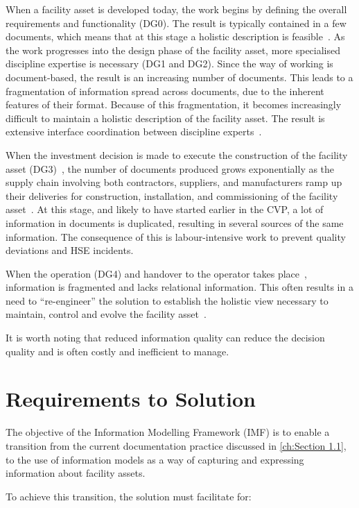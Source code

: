 \documentclass[../main.tex]{subfiles}
\begin{document}
When a facility asset is developed today, the work begins by defining the overall requirements and functionality
(DG0). The result is typically contained in a few documents, which means that at this stage a holistic description is
feasible~. As the work progresses into the design phase of the facility asset, more specialised discipline
expertise is necessary (DG1 and DG2). Since the way of working is document-based, the result is an increasing number
of documents. This leads to a fragmentation of information spread across documents, due to the inherent features of
their format. Because of this fragmentation, it becomes increasingly difficult to maintain a holistic description of the
facility asset. The result is extensive interface coordination between discipline experts~.

When the investment decision is made to execute the construction of the facility asset (DG3)~, the number of
documents produced grows exponentially as the supply chain involving both contractors, suppliers, and manufacturers
ramp up their deliveries for construction, installation, and commissioning of the facility asset~. At this
stage, and likely to have started earlier in the CVP, a lot of information in documents is duplicated, resulting in
several sources of the same information. The consequence of this is labour-intensive work to
    prevent quality deviations and HSE incidents.

When the operation (DG4) and handover to the operator takes place~, information is fragmented and lacks
relational information. This often results in a need to ``re-engineer'' the solution to establish the holistic view
necessary to maintain, control and evolve the facility asset~.

It is worth noting that reduced information quality can reduce the decision quality and is often costly and
inefficient to manage.

\section{Requirements to  Solution}
\label{ch:Section 1.2}
The objective of the Information Modelling Framework (IMF) is to enable
a transition from the current documentation practice discussed in \autoref{ch:Section 1.1}, to the use of information
  models as a way of capturing and expressing information about facility assets.

To achieve this transition, the solution  must facilitate for:
\end{document}
